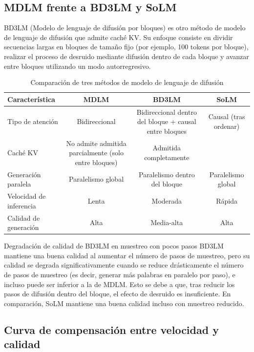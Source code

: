 \documentclass[a4paper]{article}
\begin{document}
\subsection{MDLM frente a BD3LM y SoLM}

BD3LM (Modelo de lenguaje de difusión por bloques) es otro método de modelo de lenguaje de difusión que admite caché KV. Su enfoque consiste en dividir secuencias largas en bloques de tamaño fijo (por ejemplo, 100 tokens por bloque), realizar el proceso de desruido mediante difusión dentro de cada bloque y avanzar entre bloques utilizando un modo autorregresivo.

\begin{table}[H]
\centering
\caption{Comparación de tres métodos de modelo de lenguaje de difusión}
\begin{tabular}{@{}lccc@{}}
\toprule
\textbf{Característica} & \textbf{MDLM} & \textbf{BD3LM} & \textbf{SoLM} \\
\midrule
Tipo de atención & Bidireccional & Bidireccional dentro del bloque + causal entre bloques & Causal (tras ordenar) \\
Caché KV & No admite admitida parcialmente (solo entre bloques) & Admitida completamente \\
Generación paralela & Paralelismo global & Paralelismo dentro del bloque & Paralelismo global \\
Velocidad de inferencia & Lenta & Moderada & Rápida \\
Calidad de generación & Alta & Media-alta & Alta \\
\bottomrule
\end{tabular}
\end{table}

\begin{warningbox}{Degradación de calidad de BD3LM en muestreo con pocos pasos}
BD3LM mantiene una buena calidad al aumentar el número de pasos de muestreo, pero su calidad se degrada significativamente cuando se reduce drásticamente el número de pasos de muestreo (es decir, generar más palabras en paralelo por paso), e incluso puede ser inferior a la de MDLM. Esto se debe a que, tras reducir los pasos de difusión dentro del bloque, el efecto de desruido es insuficiente. En comparación, SoLM mantiene una buena calidad incluso con muestreo reducido.
\end{warningbox}

\subsection{Curva de compensación entre velocidad y calidad}
\end{document}
